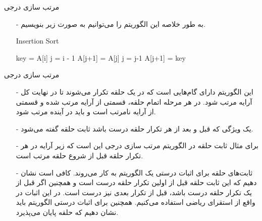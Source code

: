 \begin{frame}{‌مرتب سازی درجی}
\begin{itemize}\itemr
\item[-]
به طور خلاصه این الگوریتم را می‌توانیم به صورت زیر بنویسیم.
\begin{algorithm}[H]\alglr
  \caption{Insertion Sort} 
  \begin{algorithmic}[1]
    \newline{}
        \State key = A[i]
        \State j = i - 1
          \State A[j+1] = A[j]
          \State j = j-1
	\EndWhile
        \State A[j+1] = key
      \EndFor
  \end{algorithmic}
  \label{alg:insertion-sort}
\end{algorithm}
\end{itemize}
\end{frame}


\begin{frame}{‌مرتب سازی درجی}
\begin{itemize}\itemr
\item[-]
این الگوریتم دارای گام‌هایی است که در یک حلقه تکرار می‌شوند تا در نهایت کل آرایه مرتب شود. در هر مرحله اتمام حلقه، قسمتی از آرایه مرتب شده و قسمتی از آرایه نامرتب است و باید در آینده مرتب شود.
\item[-]
یک ویژگی که قبل و بعد از هر تکرار حلقه درست باشد ثابت حلقه
گفته می‌شود.
\item[-]
برای مثال ثابت حلقه در الگوریتم مرتب سازی درجی این است که زیر آرایه
در هر تکرار حلقه قبل از شروع حلقه مرتب است.
\item[-]
ثابت‌های حلقه برای اثبات درستی یک الگوریتم به کار می‌روند. کافی است نشان دهیم که این ثابت حلقه قبل از اولین تکرار حلقه درست است و همچنین اگر قبل از یک تکرار حلقه درست باشد، قبل از تکرار بعدی نیز درست است. در این اثبات در واقع از استقرای ریاضی استفاده می‌کنیم.
همچنین برای اثبات درستی الگوریتم باید نشان دهیم که حلقه پایان می‌پذیرد.
\end{itemize}
\end{frame}

